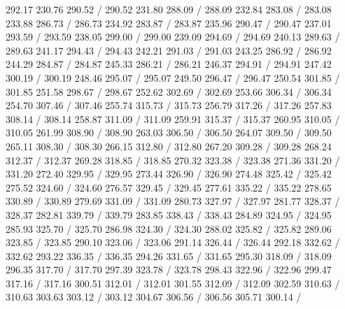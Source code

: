{ 292.17 230.76 290.52 /
 290.52 231.80 288.09 /
 288.09 232.84 283.08 /
 283.08 233.88 286.73 /
 286.73 234.92 283.87 /
 283.87 235.96 290.47 /
 290.47 237.01 293.59 /
 293.59 238.05 299.00 /
 299.00 239.09 294.69 /
 294.69 240.13 289.63 /
 289.63 241.17 294.43 /
 294.43 242.21 291.03 /
 291.03 243.25 286.92 /
 286.92 244.29 284.87 /
 284.87 245.33 286.21 /
 286.21 246.37 294.91 /
 294.91 247.42 300.19 /
 300.19 248.46 295.07 /
 295.07 249.50 296.47 /
 296.47 250.54 301.85 /
 301.85 251.58 298.67 /
 298.67 252.62 302.69 /
 302.69 253.66 306.34 /
 306.34 254.70 307.46 /
 307.46 255.74 315.73 /
 315.73 256.79 317.26 /
 317.26 257.83 308.14 /
 308.14 258.87 311.09 /
 311.09 259.91 315.37 /
 315.37 260.95 310.05 /
 310.05 261.99 308.90 /
 308.90 263.03 306.50 /
 306.50 264.07 309.50 /
 309.50 265.11 308.30 /
 308.30 266.15 312.80 /
 312.80 267.20 309.28 /
 309.28 268.24 312.37 /
 312.37 269.28 318.85 /
 318.85 270.32 323.38 /
 323.38 271.36 331.20 /
 331.20 272.40 329.95 /
 329.95 273.44 326.90 /
 326.90 274.48 325.42 /
 325.42 275.52 324.60 /
 324.60 276.57 329.45 /
 329.45 277.61 335.22 /
 335.22 278.65 330.89 /
 330.89 279.69 331.09 /
 331.09 280.73 327.97 /
 327.97 281.77 328.37 /
 328.37 282.81 339.79 /
 339.79 283.85 338.43 /
 338.43 284.89 324.95 /
 324.95 285.93 325.70 /
 325.70 286.98 324.30 /
 324.30 288.02 325.82 /
 325.82 289.06 323.85 /
 323.85 290.10 323.06 /
 323.06 291.14 326.44 /
 326.44 292.18 332.62 /
 332.62 293.22 336.35 /
 336.35 294.26 331.65 /
 331.65 295.30 318.09 /
 318.09 296.35 317.70 /
 317.70 297.39 323.78 /
 323.78 298.43 322.96 /
 322.96 299.47 317.16 /
 317.16 300.51 312.01 /
 312.01 301.55 312.09 /
 312.09 302.59 310.63 /
 310.63 303.63 303.12 /
 303.12 304.67 306.56 /
 306.56 305.71 300.14 /
}

